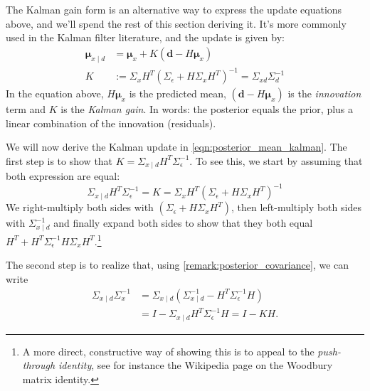 \documentclass[12pt, a4paper]{article}
\theoremstyle{spaced}
\theoremstyle{spaceddef}
\numberwithin{equation}{section}
\begin{document}
The Kalman gain form is an alternative way to express the update equations above, and we'll spend the rest of this section deriving it.
It's more commonly used in the Kalman filter literature, and the update is given by:
\begin{align}
    \label{eqn:posterior_mean_kalman}
    \bm{\mu}_{x \mid d} &= \bm{\mu}_{x} + K (\bm{d} - H \bm{\mu}_{x}) \\
    \label{eqn:kalman_gain}
    K &:= \Sigma_x H^T
    \left(
    \Sigma_\epsilon + H \Sigma_x H^T
    \right)^{-1} = \Sigma_{xd} \Sigma_d^{-1}
\end{align}
In the equation above, $H \bm{\mu}_{x}$ is the predicted mean, $(\bm{d} - H \bm{\mu}_{x})$ is the \emph{innovation} term and $K$ is the \emph{Kalman gain}.
In words: the posterior equals the prior, plus a linear combination of the innovation (residuals).

We will now derive the Kalman update in \cref{eqn:posterior_mean_kalman}.
The first step is to show that $K = \Sigma_{x \mid d}H^T \Sigma_{\epsilon}^{-1}$.
To see this, we start by assuming that both expression are equal:
\begin{equation}
    \label{eqn:push_through_kalman}
    \Sigma_{x \mid d}H^T \Sigma_{\epsilon}^{-1} =
    K =
    \Sigma_x H^T
    \left(
    \Sigma_\epsilon + H \Sigma_x H^T
    \right)^{-1}
\end{equation}
We right-multiply both sides with $\left(
\Sigma_\epsilon + H \Sigma_x H^T
\right)$, then left-multiply both sides with $\Sigma_{x \mid d}^{-1}$ and finally expand both sides to show that they both equal $H^T + H^T \Sigma_\epsilon^{-1} H \Sigma_x H^T$.\footnote{A more direct, constructive way of showing this is to appeal to the \emph{push-through identity}, see for instance the Wikipedia page on the Woodbury matrix identity.}

The second step is to realize that, using \cref{remark:posterior_covariance}, we can write
\begin{align*}
    \Sigma_{x \mid d}\Sigma_{x}^{-1} &=
    \Sigma_{x \mid d}
    \left( \Sigma_{x \mid d}^{-1} - H^T \Sigma_{\epsilon}^{-1} H \right) \\
    &= I - \Sigma_{x \mid d}  H^T \Sigma_{\epsilon}^{-1} H =  I - KH.
\end{align*}
\end{document}
